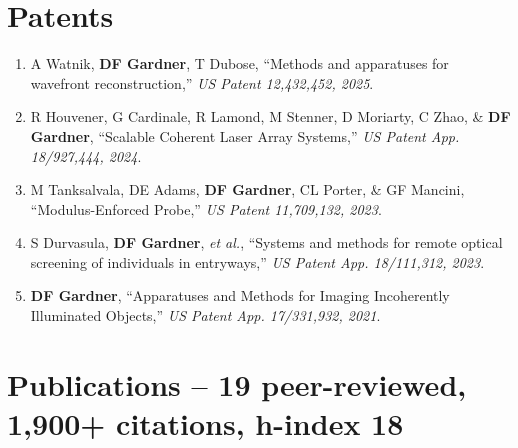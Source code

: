 \documentclass[letterpaper,12pt]{article}
\begin{document}
\section{Patents}
\vspace{0.2cm}
\begin{enumerate}[leftmargin=*]
	\item A Watnik, \textbf{DF Gardner}, T Dubose, ``Methods and apparatuses for wavefront reconstruction,'' \emph{US Patent 12,432,452, 2025}.
    \item R Houvener, G Cardinale, R Lamond, M Stenner, D Moriarty, C Zhao, \& \textbf{DF Gardner}, ``Scalable Coherent Laser Array Systems,'' \emph{US Patent App. 18/927,444, 2024}.
	\item  M Tanksalvala, DE Adams, \textbf{DF Gardner}, CL Porter, \& GF Mancini, ``Modulus-Enforced Probe,'' \emph{US Patent 11,709,132, 2023}.
	\item S Durvasula, \textbf{DF Gardner}, \emph{et al.}, ``Systems and methods for remote optical screening of individuals in entryways,'' \emph{US Patent App. 18/111,312, 2023}.
	\item \textbf{DF Gardner}, ``Apparatuses and Methods for Imaging Incoherently Illuminated Objects,'' \emph{US Patent App. 17/331,932, 2021}.
\end{enumerate}

\section{Publications -- 19 peer-reviewed, 1,900+ citations, h-index 18}
\vspace{0.2cm}

\end{document}
